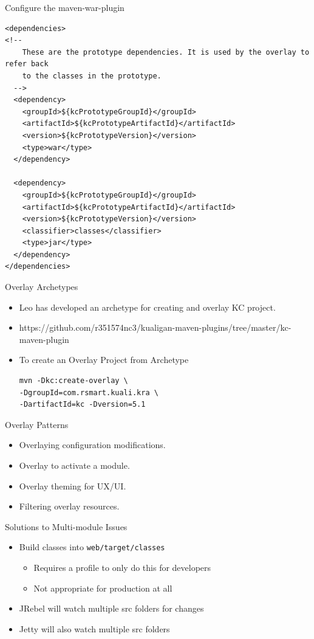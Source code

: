 \documentclass[xcolor=dvipsnames,14pt,professionalfonts]{beamer}
\begin{document}
\begin{frame}[fragile]{Configure the maven-war-plugin}
  \begin{verbatim}
<dependencies>
<!--
    These are the prototype dependencies. It is used by the overlay to refer back
    to the classes in the prototype.
  -->
  <dependency>
    <groupId>${kcPrototypeGroupId}</groupId>
    <artifactId>${kcPrototypeArtifactId}</artifactId>
    <version>${kcPrototypeVersion}</version>
    <type>war</type>
  </dependency>
  
  <dependency>
    <groupId>${kcPrototypeGroupId}</groupId>
    <artifactId>${kcPrototypeArtifactId}</artifactId>
    <version>${kcPrototypeVersion}</version>
    <classifier>classes</classifier>
    <type>jar</type>
  </dependency>
</dependencies>
  \end{verbatim}
\end{frame}

\begin{frame}[fragile]{Overlay Archetypes}
  \begin{itemize}
  \item Leo has developed an archetype for creating and overlay KC project.
  \item https://github.com/r351574nc3/kualigan-maven-plugins/tree/master/kc-maven-plugin
  \item To create an Overlay Project from Archetype
  \begin{verbatim}
mvn -Dkc:create-overlay \
-DgroupId=com.rsmart.kuali.kra \
-DartifactId=kc -Dversion=5.1
  \end{verbatim}
  \end{itemize}
\end{frame}

\begin{frame}{Overlay Patterns}
  \begin{itemize}
    \item Overlaying configuration modifications.
    \item Overlay to activate a module.
    \item Overlay theming for UX/UI.
    \item Filtering overlay resources.
  \end{itemize}
\end{frame}

\begin{frame}{Solutions to Multi-module Issues}
  \begin{itemize}
    \item Build classes into \texttt{web/target/classes}
      \begin{itemize}
        \item Requires a profile to only do this for developers
        \item Not appropriate for production at all
      \end{itemize}
    \item JRebel will watch multiple src folders for changes
    \item Jetty will also watch multiple src folders
  \end{itemize}
\end{frame}
\end{document}
